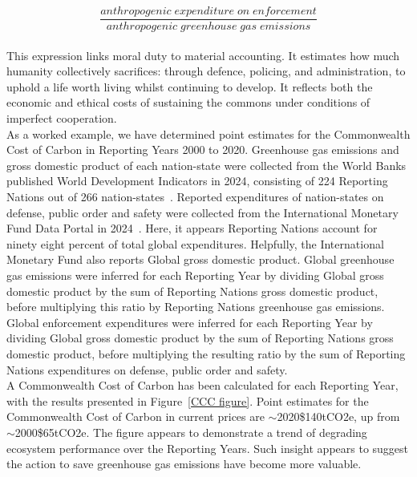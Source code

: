 \documentclass[12pt, oneside]{article}   	%
\begin{document}
\begin{equation}
	\frac{anthropogenic\; expenditure\; on\; enforcement}{anthropogenic\; greenhouse\; gas\; emissions}
\end{equation}\\

This expression links moral duty to material accounting.
It estimates how much humanity collectively sacrifices: through defence, policing, and administration, to uphold a life worth living whilst continuing to develop.
It reflects both the economic and ethical costs of sustaining the commons under conditions of imperfect cooperation.\\

As a worked example, we have determined point estimates for the Commonwealth Cost of Carbon in Reporting Years 2000 to 2020.
Greenhouse gas emissions and gross domestic product of each nation-state were collected from the World Banks published World Development Indicators in 2024, consisting of 224 Reporting Nations out of 266 nation-states~\cite{wbank}.
Reported expenditures of nation-states on defense, public order and safety were collected from the International Monetary Fund Data Portal in 2024~\cite{imf}.
Here, it appears Reporting Nations account for ninety eight percent of total global expenditures.
Helpfully, the International Monetary Fund also reports Global gross domestic product.
Global greenhouse gas emissions were inferred for each Reporting Year by dividing Global gross domestic product by the sum of Reporting Nations gross domestic product, before multiplying this ratio by Reporting Nations greenhouse gas emissions.
Global enforcement expenditures were inferred for each Reporting Year by dividing Global gross domestic product by the sum of Reporting Nations gross domestic product, before multiplying the resulting ratio by the sum of Reporting Nations expenditures on defense, public order and safety.\\
A Commonwealth Cost of Carbon has been calculated for each Reporting Year, with the results presented in Figure~\ref{CCC figure}.
Point estimates for the Commonwealth Cost of Carbon in current prices are $\sim$2020\$140tCO2e, up from $\sim$2000\$65tCO2e.
The figure appears to demonstrate a trend of degrading ecosystem performance over the Reporting Years.
Such insight appears to suggest the action to save greenhouse gas emissions have become more valuable.\\
\end{document}
